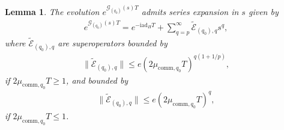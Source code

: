 \documentclass[aps,pra,reprint,groupedaddress,floatfix]{revtex4-2}
\newtheorem{lemma}{Lemma}
\renewcommand{\i}{\mathrm{i}}
\newcommand{\ad}{\mathrm{ad}}
\newcommand{\G}{\mathcal{G}}
\newcommand{\E}{\mathcal{E}}
\begin{document}
\begin{lemma}
\label{lem:expansion-exp-G(s)}
    The evolution $e^{\G_{(q_0)}(s) T}$ admits series expansion in $s$ given by \begin{align*}
        e^{\G_{(q_0)}(s) T}=e^{-\i \ad_H T}+ \sum_{q=p}^{\infty}\tilde{\E}_{(q_0),q} s^q,
    \end{align*}
    where $\tilde{\E}_{(q_0),q}$ are superoperators bounded by \begin{align*}
       \|\tilde{\E}_{(q_0),q}\|\le   e(2\mu_{\mathrm{comm},q_0}T)^{q(1+1/p)},
    \end{align*}
    if $2\mu_{\mathrm{comm},q_0}T\ge 1$, and bounded by \begin{align*}
        \|\tilde{\E}_{(q_0),q}\|\le e(2\mu_{\mathrm{comm},q_0}T)^{q},
    \end{align*}
    if $2\mu_{\mathrm{comm},q_0}T\le 1$.
\end{lemma}
\end{document}
